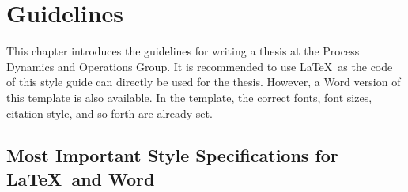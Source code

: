 \chapter{Guidelines}\label{ch:styleguide}
This chapter introduces the guidelines for writing a thesis at the Process Dynamics and Operations Group. It is recommended to use \LaTeX\ as the code of this style guide can directly be used for the thesis. However, a Word version of this template is also available. In the template, the correct fonts, font sizes, citation style, and so forth are already set.
\section{Most Important Style Specifications for \LaTeX\ and Word}
